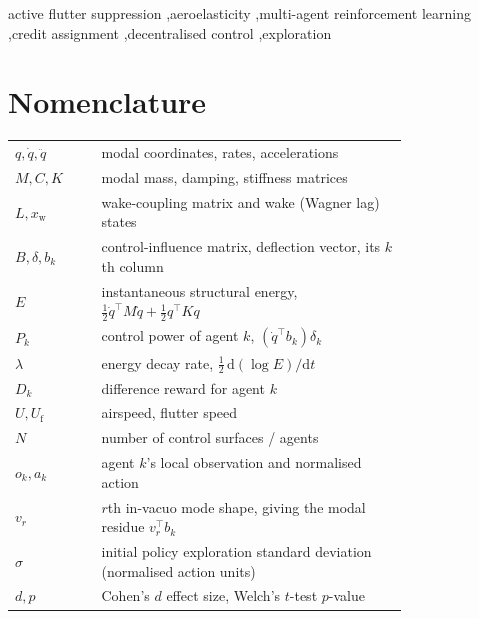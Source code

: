 \documentclass[preprint,11pt]{elsarticle}
\newcommand{\Uf}{U_{\mathrm{f}}}
\begin{document}
\begin{frontmatter}
\begin{samepage}
\begin{keyword}
active flutter suppression \sep aeroelasticity \sep multi-agent reinforcement
learning \sep credit assignment \sep decentralised control \sep exploration
\end{keyword}
\end{samepage}

\end{frontmatter}

\section*{Nomenclature}
\begin{tabular}{@{}lp{0.78\linewidth}@{}}
$q,\dot q,\ddot q$ & modal coordinates, rates, accelerations \\
$M,C,K$ & modal mass, damping, stiffness matrices \\
$L,x_{\mathrm{w}}$ & wake-coupling matrix and wake (Wagner lag) states \\
$B,\delta,b_k$ & control-influence matrix, deflection vector, its $k$th column \\
$E$ & instantaneous structural energy, $\tfrac12\dot q^\top M\dot q+\tfrac12 q^\top Kq$ \\
$P_k$ & control power of agent $k$, $(\dot q^\top b_k)\delta_k$ \\
$\lambda$ & energy decay rate, $\tfrac12\,\mathrm{d}(\log E)/\mathrm{d}t$ \\
$D_k$ & difference reward for agent $k$ \\
$U,\Uf$ & airspeed, flutter speed \\
$N$ & number of control surfaces / agents \\
$o_k,a_k$ & agent $k$'s local observation and normalised action \\
$v_r$ & $r$th in-vacuo mode shape, giving the modal residue $v_r^\top b_k$ \\
$\sigma$ & initial policy exploration standard deviation (normalised action units) \\
$d,p$ & Cohen's $d$ effect size, Welch's $t$-test $p$-value \\
\end{tabular}
\end{document}
